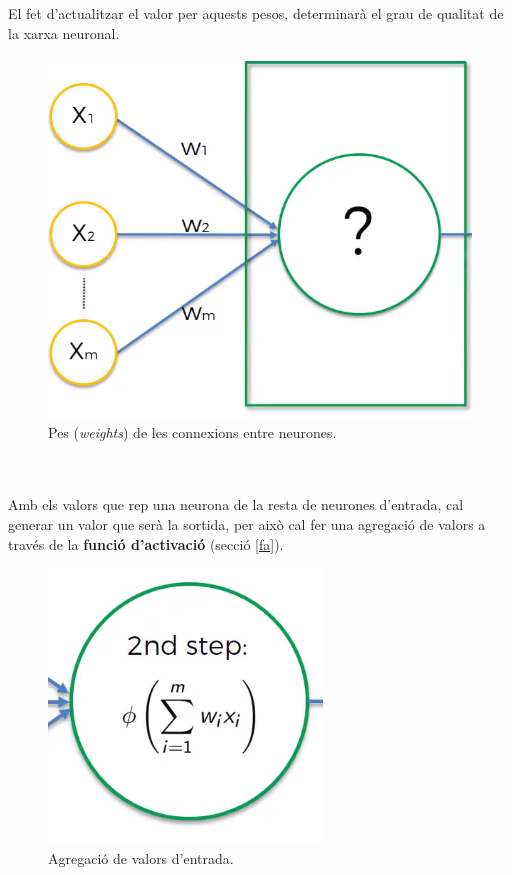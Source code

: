 \documentclass[12pt]{article}
\begin{document}
\\\\El fet d'actualitzar el valor per aquests pesos, determinarà el grau de qualitat de la xarxa neuronal.
\begin{figure}[h!]
	\centering
	\includegraphics[scale=0.2]{imatges/neurona/6pes.png}
	\caption{Pes (\textit{weights}) de les connexions entre neurones.}
\end{figure}
\pagebreak
\\\\Amb els valors que rep una neurona de la resta de neurones d'entrada, cal generar un valor que serà la sortida, per això cal fer una agregació de valors a través de la \textbf{funció d'activació} (secció \ref{fa}).
\begin{figure}[h!]
	\centering
	\includegraphics[scale=0.4]{imatges/neurona/7activacio.png}
	\caption{Agregació de valors d'entrada.}
\end{figure}
\end{document}

